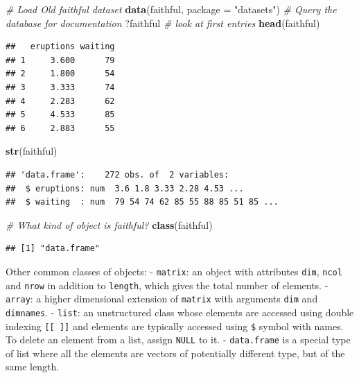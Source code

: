 \documentclass[]{book}
\newenvironment{Shaded}{\begin{snugshade}}{\end{snugshade}}
\newcommand{\KeywordTok}[1]{\textcolor[rgb]{0.13,0.29,0.53}{\textbf{#1}}}
\newcommand{\DataTypeTok}[1]{\textcolor[rgb]{0.13,0.29,0.53}{#1}}
\newcommand{\StringTok}[1]{\textcolor[rgb]{0.31,0.60,0.02}{#1}}
\newcommand{\CommentTok}[1]{\textcolor[rgb]{0.56,0.35,0.01}{\textit{#1}}}
\newcommand{\NormalTok}[1]{#1}
\theoremstyle{definition}
\theoremstyle{definition}
\theoremstyle{definition}
\theoremstyle{remark}
\begin{document}
\begin{Shaded}
\begin{Highlighting}[]
\CommentTok{# Load Old faithful dataset}
\KeywordTok{data}\NormalTok{(faithful, }\DataTypeTok{package =} \StringTok{"datasets"}\NormalTok{)}
\CommentTok{# Query the database for documentation}
\NormalTok{?faithful}
\CommentTok{# look at first entries}
\KeywordTok{head}\NormalTok{(faithful)}
\end{Highlighting}
\end{Shaded}

\begin{verbatim}
##   eruptions waiting
## 1     3.600      79
## 2     1.800      54
## 3     3.333      74
## 4     2.283      62
## 5     4.533      85
## 6     2.883      55
\end{verbatim}

\begin{Shaded}
\begin{Highlighting}[]
\KeywordTok{str}\NormalTok{(faithful)}
\end{Highlighting}
\end{Shaded}

\begin{verbatim}
## 'data.frame':    272 obs. of  2 variables:
##  $ eruptions: num  3.6 1.8 3.33 2.28 4.53 ...
##  $ waiting  : num  79 54 74 62 85 55 88 85 51 85 ...
\end{verbatim}

\begin{Shaded}
\begin{Highlighting}[]
\CommentTok{# What kind of object is faithful? }
\KeywordTok{class}\NormalTok{(faithful)}
\end{Highlighting}
\end{Shaded}

\begin{verbatim}
## [1] "data.frame"
\end{verbatim}

Other common classes of objects: - \texttt{matrix}: an object with
attributes \texttt{dim}, \texttt{ncol} and \texttt{nrow} in addition to
\texttt{length}, which gives the total number of elements. -
\texttt{array}: a higher dimensional extension of \texttt{matrix} with
arguments \texttt{dim} and \texttt{dimnames}. - \texttt{list}: an
unstructured class whose elements are accessed using double indexing
\texttt{{[}{[}\ {]}{]}} and elements are typically accessed using
\texttt{\$} symbol with names. To delete an element from a list, assign
\texttt{NULL} to it. - \texttt{data.frame} is a special type of list
where all the elements are vectors of potentially different type, but of
the same length.
\end{document}
